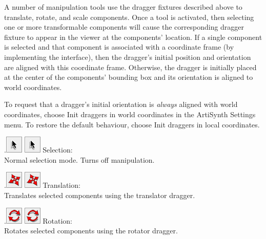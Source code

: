 \documentclass{article}
\begin{document}
A number of manipulation tools use the dragger fixtures described
above to translate, rotate, and scale components. Once a tool is
activated, then selecting one or more transformable components will
cause the corresponding dragger fixture to appear in the viewer at the
components' location. If a single component is selected and 
that component is 
associated with a coordinate frame (by implementing the
 interface), 
then the dragger's initial position
and orientation are aligned with this coordinate frame.
Otherwise, the dragger is initially placed at the center of the
components' bounding box and its orientation is aligned to world
coordinates.

To request that a dragger's initial orientation is {\it always}
aligned with world coordinates, choose {\sf Init draggers in world
coordinates} in the ArtiSynth {\sf Settings} menu. To restore the
default behaviour, choose {\sf Init draggers in local coordinates}.

\iflatexml
.\includegraphics[]{images/selectTool}
\else
\includegraphics[width=.33in]{images/selectTool}
\fi
{\sf Selection:}\\
Normal selection mode. Turns off manipulation.

\vspace{\parskip}
\iflatexml
.\includegraphics[]{images/translateTool}
\else
\includegraphics[width=.33in]{images/translateTool}
\fi
{\sf Translation:}\\
Translates selected components using the translator dragger.

\vspace{\parskip}
\iflatexml
.\includegraphics[]{images/rotateTool}
\else
\includegraphics[width=.33in]{images/rotateTool}
\fi
{\sf Rotation:}\\
Rotates selected components using the rotator dragger.
\end{document}
